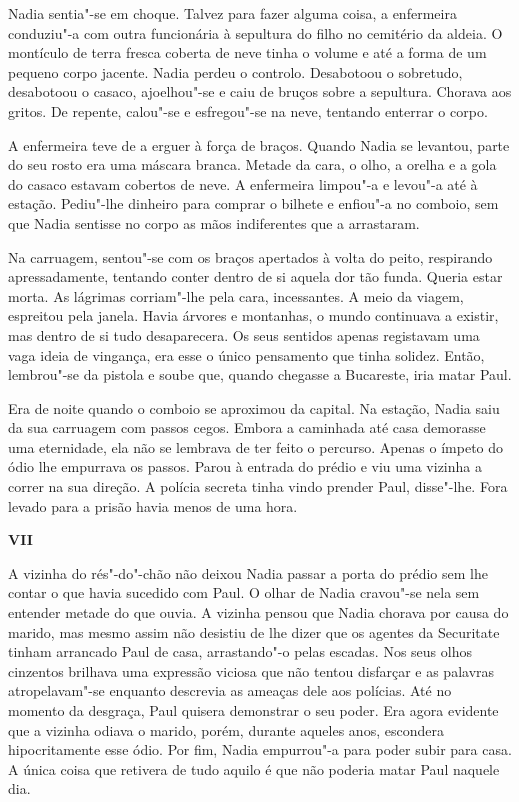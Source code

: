 Nadia sentia"-se em choque. Talvez para
fazer alguma coisa, a enfermeira conduziu"-a com outra funcionária à
sepultura do filho no cemitério da aldeia. O montículo de terra fresca
coberta de neve tinha o volume e até a forma de um pequeno corpo
jacente. Nadia perdeu o controlo. Desabotoou o sobretudo, desabotoou o
casaco, ajoelhou"-se e caiu de bruços sobre a sepultura. Chorava aos
gritos. De repente, calou"-se e esfregou"-se na neve, tentando enterrar o
corpo.

A enfermeira teve de a erguer à força de braços. Quando Nadia se
levantou, parte do seu rosto era uma máscara branca. Metade da cara, o
olho, a orelha e a gola do casaco estavam cobertos de neve. A enfermeira
limpou"-a e levou"-a até à estação. Pediu"-lhe dinheiro para comprar o
bilhete e enfiou"-a no comboio, sem que Nadia sentisse no corpo as mãos
indiferentes que a arrastaram.

Na carruagem, sentou"-se com os braços apertados à volta do peito,
respirando apressadamente, tentando conter dentro de si aquela dor tão
funda. Queria estar morta. As lágrimas corriam"-lhe pela cara,
incessantes. A meio da viagem, espreitou pela janela. Havia árvores e
montanhas, o mundo continuava a existir, mas dentro de si tudo desaparecera. Os seus sentidos apenas registavam uma vaga ideia de vingança,
era esse o único pensamento que tinha solidez. Então, lembrou"-se da
pistola e soube que, quando chegasse a Bucareste, iria matar Paul.

Era de noite quando o comboio se aproximou da capital. Na estação, Nadia
saiu da sua carruagem com passos cegos. Embora a caminhada até casa
demorasse uma eternidade, ela não se lembrava de ter feito o percurso.
Apenas o ímpeto do ódio lhe empurrava os passos. Parou à entrada do
prédio e viu uma vizinha a correr na sua direção. A polícia secreta
tinha vindo prender Paul, disse"-lhe. Fora levado para a prisão havia
menos de uma hora.

\pagebreak
\thispagestyle{empty}
\movetooddpage
\vspace*{1.8cm}
\noindent{}\textbf{VII}

\bigskip

A vizinha do rés"-do"-chão não deixou Nadia passar a porta do prédio sem
lhe contar o que havia sucedido com Paul. O olhar de Nadia cravou"-se
nela sem entender metade do que ouvia. A vizinha pensou que Nadia
chorava por causa do marido, mas mesmo assim não desistiu de lhe dizer
que os agentes da Securitate tinham arrancado Paul de casa, arrastando"-o
pelas escadas. Nos seus olhos cinzentos brilhava uma expressão viciosa
que não tentou disfarçar e as palavras atropelavam"-se enquanto
descrevia as ameaças dele aos polícias. Até no momento da desgraça, Paul
quisera demonstrar o seu poder. Era agora evidente que a vizinha odiava
o marido, porém, durante aqueles anos, escondera hipocritamente esse
ódio. Por fim, Nadia empurrou"-a para poder subir para casa. A única
coisa que retivera de tudo aquilo é que não poderia matar Paul naquele
dia.

